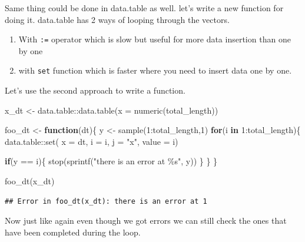 \documentclass[
]{book}
\newenvironment{Shaded}{\begin{snugshade}}{\end{snugshade}}
\newcommand{\AttributeTok}[1]{\textcolor[rgb]{0.77,0.63,0.00}{#1}}
\newcommand{\ControlFlowTok}[1]{\textcolor[rgb]{0.13,0.29,0.53}{\textbf{#1}}}
\newcommand{\DecValTok}[1]{\textcolor[rgb]{0.00,0.00,0.81}{#1}}
\newcommand{\FunctionTok}[1]{\textcolor[rgb]{0.00,0.00,0.00}{#1}}
\newcommand{\NormalTok}[1]{#1}
\newcommand{\OtherTok}[1]{\textcolor[rgb]{0.56,0.35,0.01}{#1}}
\newcommand{\SpecialCharTok}[1]{\textcolor[rgb]{0.00,0.00,0.00}{#1}}
\newcommand{\StringTok}[1]{\textcolor[rgb]{0.31,0.60,0.02}{#1}}
\providecommand{\tightlist}{%
  \setlength{\itemsep}{0pt}\setlength{\parskip}{0pt}}
\begin{document}
Same thing could be done in data.table as well. let's write a new function for doing it. data.table has 2 ways of looping through the vectors.

\begin{enumerate}
\def\labelenumi{\arabic{enumi}.}
\tightlist
\item
  With \texttt{:=} operator which is slow but useful for more data insertion than one by one
\item
  with \texttt{set} function which is faster where you need to insert data one by one.
\end{enumerate}

Let's use the second approach to write a function.

\begin{Shaded}
\begin{Highlighting}[]
\NormalTok{x\_dt }\OtherTok{\textless{}{-}}\NormalTok{ data.table}\SpecialCharTok{::}\FunctionTok{data.table}\NormalTok{(}\AttributeTok{x =} \FunctionTok{numeric}\NormalTok{(total\_length))}

\NormalTok{foo\_dt }\OtherTok{\textless{}{-}} \ControlFlowTok{function}\NormalTok{(dt)\{}
\NormalTok{  y }\OtherTok{\textless{}{-}} \FunctionTok{sample}\NormalTok{(}\DecValTok{1}\SpecialCharTok{:}\NormalTok{total\_length,}\DecValTok{1}\NormalTok{)}
  \ControlFlowTok{for}\NormalTok{(i }\ControlFlowTok{in} \DecValTok{1}\SpecialCharTok{:}\NormalTok{total\_length)\{}
\NormalTok{    data.table}\SpecialCharTok{::}\FunctionTok{set}\NormalTok{(}
      \AttributeTok{x =}\NormalTok{ dt,}
      \AttributeTok{i =}\NormalTok{ i,}
      \AttributeTok{j =} \StringTok{"x"}\NormalTok{,}
      \AttributeTok{value =}\NormalTok{ i)}

    \ControlFlowTok{if}\NormalTok{(y }\SpecialCharTok{==}\NormalTok{ i)\{}
      \FunctionTok{stop}\NormalTok{(}\FunctionTok{sprintf}\NormalTok{(}\StringTok{"there is an error at \%s"}\NormalTok{, y))}
\NormalTok{    \}}
\NormalTok{  \}}
\NormalTok{\}}

\FunctionTok{foo\_dt}\NormalTok{(x\_dt)}
\end{Highlighting}
\end{Shaded}

\begin{verbatim}
## Error in foo_dt(x_dt): there is an error at 1
\end{verbatim}

Now just like again even though we got errors we can still check the ones that have been completed during the loop.
\end{document}
